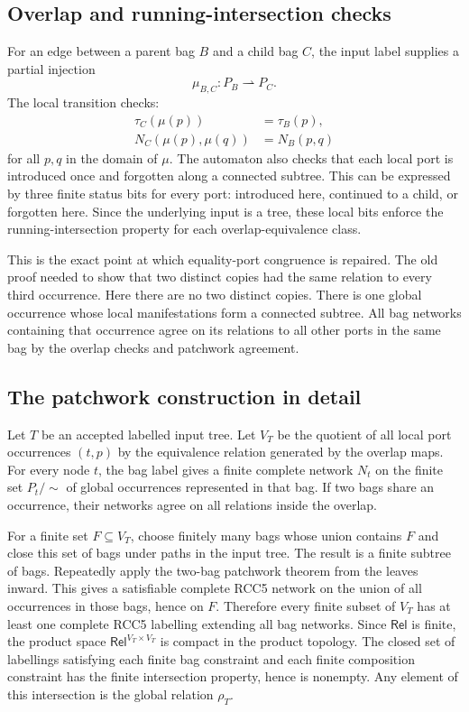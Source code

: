 \documentclass[11pt]{article}
\newcommand{\Rel}{\mathsf{Rel}}
\begin{document}
\subsection{Overlap and running-intersection checks}

For an edge between a parent bag $B$ and a child bag $C$, the input label supplies a
partial injection
\[
  \mu_{B,C}:P_B\rightharpoonup P_C.
\]
The local transition checks:
\begin{align*}
  \tau_C(\mu(p)) &= \tau_B(p),\\
  N_C(\mu(p),\mu(q)) &= N_B(p,q)
\end{align*}
for all $p,q$ in the domain of $\mu$.  The automaton also checks that each local port is
introduced once and forgotten along a connected subtree.  This can be expressed by three
finite status bits for every port: introduced here, continued to a child, or forgotten
here.  Since the underlying input is a tree, these local bits enforce the
running-intersection property for each overlap-equivalence class.

This is the exact point at which equality-port congruence is repaired.  The old proof
needed to show that two distinct copies had the same relation to every third occurrence.
Here there are no two distinct copies.  There is one global occurrence whose local
manifestations form a connected subtree.  All bag networks containing that occurrence
agree on its relations to all other ports in the same bag by the overlap checks and
patchwork agreement.

\subsection{The patchwork construction in detail}

Let $T$ be an accepted labelled input tree.  Let $V_T$ be the quotient of all local port
occurrences $(t,p)$ by the equivalence relation generated by the overlap maps.  For every
node $t$, the bag label gives a finite complete network $N_t$ on the finite set
$P_t/{\sim}$ of global occurrences represented in that bag.  If two bags share an
occurrence, their networks agree on all relations inside the overlap.

For a finite set $F\subseteq V_T$, choose finitely many bags whose union contains $F$ and
close this set of bags under paths in the input tree.  The result is a finite subtree of
bags.  Repeatedly apply the two-bag patchwork theorem from the leaves inward.  This gives
a satisfiable complete RCC5 network on the union of all occurrences in those bags, hence
on $F$.  Therefore every finite subset of $V_T$ has at least one complete RCC5 labelling
extending all bag networks.  Since $\Rel$ is finite, the product space
$\Rel^{V_T\times V_T}$ is compact in the product topology.  The closed set of labellings
satisfying each finite bag constraint and each finite composition constraint has the
finite intersection property, hence is nonempty.  Any element of this intersection is the
global relation $\rho_T$.
\end{document}
